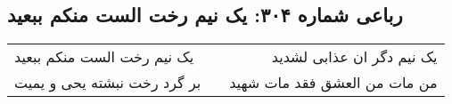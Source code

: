 \begin{center}
\section*{رباعی شماره ۳۰۴: یک نیم رخت الست منکم ببعید}
\label{sec:sh304}
\begin{longtable}{l p{0.5cm} r}
یک نیم رخت الست منکم ببعید
&&
یک نیم دگر ان عذابی لشدید
\\
بر گرد رخت نبشته یحی و یمیت
&&
من مات من العشق فقد مات شهید
\\
\end{longtable}
\end{center}
